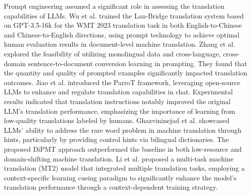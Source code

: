\documentclass[acmsmall]{acmart}
\begin{document}
Prompt engineering assumed a significant role in assessing the translation capabilities of LLMs. Wu et al. \cite{Yangjian} trained the Lan-Bridge translation system based on GPT-3.5-16k for the WMT 2023 translation task in both English-to-Chinese and Chinese-to-English directions, using prompt technology to achieve optimal human evaluation results in document-level machine translation. Zhang et al. \cite{Biao} explored the feasibility of utilizing monolingual data and cross-language, cross-domain sentence-to-document conversion learning in prompting. They found that the quantity and quality of prompted examples significantly impacted translation outcomes. Jiao et al. \cite{Wenxiang} introduced the ParroT framework, leveraging open-source LLMs to enhance and regulate translation capabilities in chat. Experimental results indicated that translation instructions notably improved the original LLM's translation performance, emphasizing the importance of learning from low-quality translations labeled by humans. Ghazvininejad et al. \cite{Marjan} showcased LLMs' ability to address the rare word problem in machine translation through hints, particularly by providing control hints via bilingual dictionaries. The proposed DiPMT approach outperformed the baseline in both low-resource and domain-shifting machine translation. Li et al. \cite{Chunyou} proposed a multi-task machine translation (MT2) model that integrated multiple translation tasks, employing a context-specific learning cueing paradigm to significantly enhance the model's translation performance through a context-dependent training strategy.
\end{document}
